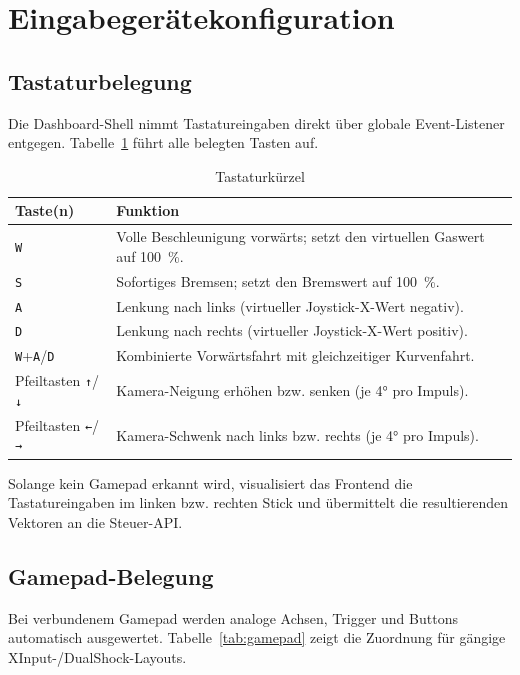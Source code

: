 \documentclass[a4paper,11pt]{article}
\begin{document}
\section{Eingabegerätekonfiguration}

\subsection{Tastaturbelegung}
Die Dashboard-Shell nimmt Tastatureingaben direkt über globale Event-Listener entgegen. Tabelle~\ref{tab:keyboard}
führt alle belegten Tasten auf.

\begin{longtable}{p{3cm}p{10cm}}
\caption{Tastaturkürzel}\label{tab:keyboard}\\
\textbf{Taste(n)} & \textbf{Funktion}\\\hline
\texttt{W} & Volle Beschleunigung vorwärts; setzt den virtuellen Gaswert auf 100~\%.\\
\texttt{S} & Sofortiges Bremsen; setzt den Bremswert auf 100~\%.\\
\texttt{A} & Lenkung nach links (virtueller Joystick-X-Wert negativ).\\
\texttt{D} & Lenkung nach rechts (virtueller Joystick-X-Wert positiv).\\
\texttt{W}+\texttt{A}/\texttt{D} & Kombinierte Vorwärtsfahrt mit gleichzeitiger Kurvenfahrt.\\
Pfeiltasten \texttt{↑}/\texttt{↓} & Kamera-Neigung erhöhen bzw. senken (je 4° pro Impuls).\\
Pfeiltasten \texttt{←}/\texttt{→} & Kamera-Schwenk nach links bzw. rechts (je 4° pro Impuls).\\
\end{longtable}

Solange kein Gamepad erkannt wird, visualisiert das Frontend die Tastatureingaben im linken bzw. rechten Stick und
übermittelt die resultierenden Vektoren an die Steuer-API.

\subsection{Gamepad-Belegung}
Bei verbundenem Gamepad werden analoge Achsen, Trigger und Buttons automatisch ausgewertet. Tabelle~\ref{tab:gamepad}
zeigt die Zuordnung für gängige XInput-/DualShock-Layouts.
\end{document}
